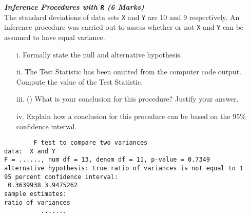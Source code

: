 

\item[(d)] \textbf{\textit{Inference Procedures with \texttt{R} (6 Marks)}}\\
The standard deviations of data sets \texttt{X} and \texttt{Y} are 10 and 9 respectively. 
An inference procedure was carried out to assess whether or not \texttt{X} and \texttt{Y} can be assumed to have equal variance.
\begin{itemize}

\item[i.] Formally state the null and alternative hypothesis.

\item[ii.] The Test Statistic has been omitted from the computer code output. Compute the value of the Test Statistic.

\item[iii.]() What is your conclusion for this procedure? Justify your answer.

\item[iv.] Explain how a conclusion for this procedure can be based on the $95\%$ confidence interval.
\end{itemize}

\begin{framed}
\begin{verbatim}
        F test to compare two variances
data:  X and Y
F = ......, num df = 13, denom df = 11, p-value = 0.7349
alternative hypothesis: true ratio of variances is not equal to 1
95 percent confidence interval:
 0.3639938 3.9475262
sample estimates:
ratio of variances
          .......
\end{verbatim}
\end{framed}
